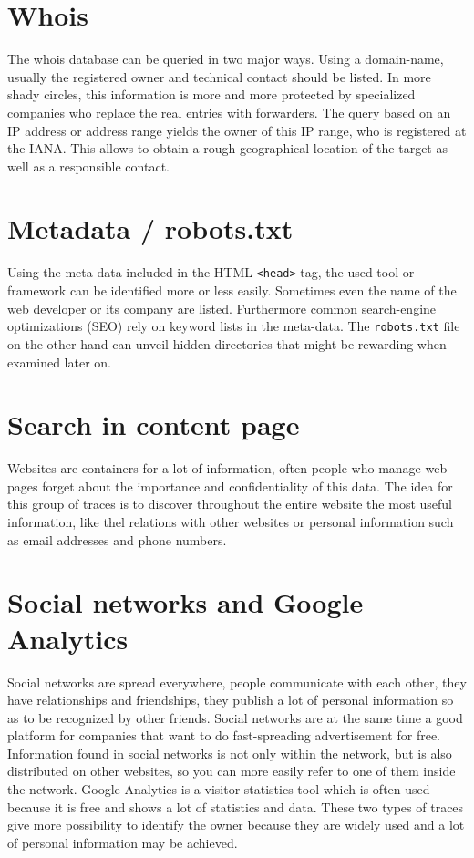 \documentclass[
	a4paper,					10pt,							twoside,					openright,				notitlepage,			parskip=half,			]{scrreprt}
\begin{document}
\section{Whois}
\label{sec:seltraces_Whois}

The whois database can be queried in two major ways. Using a domain-name, usually the registered owner and
technical contact should be listed. In more shady circles, this information is more and more protected by
specialized companies who replace the real entries with forwarders. 
The query based on an \gls{IP} address or address range yields the owner of this \gls{IP} range, who is registered at the \gls{IANA}.
This allows to obtain a rough geographical location of the target as well as a responsible contact. 

\section{Metadata / robots.txt}
\label{sec:seltraces_Metadata}

Using the meta-data included in the \gls{HTML} \verb|<head>| tag, the used tool or framework can be identified
more or less easily. Sometimes even the name of the web developer or its company are listed. Furthermore
common search-engine optimizations (\gls{SEO}) rely on keyword lists in the meta-data.
The \verb|robots.txt| file on the other hand can unveil hidden directories that might be rewarding when examined
later on.

\section{Search in content page}
\label{sec:seltraces_ContentPage}

Websites are containers for a lot of information, often people who manage web pages forget about
the importance and confidentiality of this data. 
The idea for this group of traces is to discover throughout the entire website the most useful information,
like thel relations with other websites or personal information such as email addresses and phone numbers.

\section{Social networks and Google Analytics}
\label{sec:seltraces_SocialNetworksAndVisitorStatistics}
Social networks are spread everywhere, people communicate with each other, they have relationships and friendships, 
they publish a lot of personal information so as to be recognized by other friends.
Social networks are at the same time a good platform for companies that want to do fast-spreading advertisement for free. 
Information found in social networks is not only within the network, but is also distributed on other websites, 
so you can more easily refer to one of them inside the network.
Google Analytics is a visitor statistics tool which is often used because it is free and shows a lot of statistics and data. 
These two types of traces give more possibility to identify the owner because they are widely used and 
a lot of personal information may be achieved.
\end{document}
